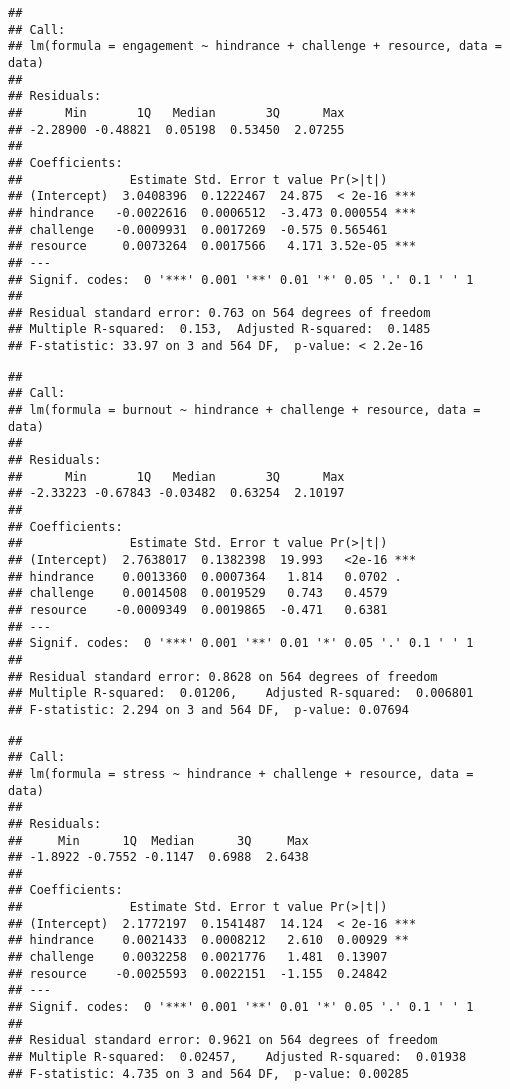 \documentclass[
  man]{apa6}
\begin{document}
\begin{verbatim}
## 
## Call:
## lm(formula = engagement ~ hindrance + challenge + resource, data = data)
## 
## Residuals:
##      Min       1Q   Median       3Q      Max 
## -2.28900 -0.48821  0.05198  0.53450  2.07255 
## 
## Coefficients:
##               Estimate Std. Error t value Pr(>|t|)    
## (Intercept)  3.0408396  0.1222467  24.875  < 2e-16 ***
## hindrance   -0.0022616  0.0006512  -3.473 0.000554 ***
## challenge   -0.0009931  0.0017269  -0.575 0.565461    
## resource     0.0073264  0.0017566   4.171 3.52e-05 ***
## ---
## Signif. codes:  0 '***' 0.001 '**' 0.01 '*' 0.05 '.' 0.1 ' ' 1
## 
## Residual standard error: 0.763 on 564 degrees of freedom
## Multiple R-squared:  0.153,  Adjusted R-squared:  0.1485 
## F-statistic: 33.97 on 3 and 564 DF,  p-value: < 2.2e-16
\end{verbatim}

\begin{verbatim}
## 
## Call:
## lm(formula = burnout ~ hindrance + challenge + resource, data = data)
## 
## Residuals:
##      Min       1Q   Median       3Q      Max 
## -2.33223 -0.67843 -0.03482  0.63254  2.10197 
## 
## Coefficients:
##               Estimate Std. Error t value Pr(>|t|)    
## (Intercept)  2.7638017  0.1382398  19.993   <2e-16 ***
## hindrance    0.0013360  0.0007364   1.814   0.0702 .  
## challenge    0.0014508  0.0019529   0.743   0.4579    
## resource    -0.0009349  0.0019865  -0.471   0.6381    
## ---
## Signif. codes:  0 '***' 0.001 '**' 0.01 '*' 0.05 '.' 0.1 ' ' 1
## 
## Residual standard error: 0.8628 on 564 degrees of freedom
## Multiple R-squared:  0.01206,    Adjusted R-squared:  0.006801 
## F-statistic: 2.294 on 3 and 564 DF,  p-value: 0.07694
\end{verbatim}

\begin{verbatim}
## 
## Call:
## lm(formula = stress ~ hindrance + challenge + resource, data = data)
## 
## Residuals:
##     Min      1Q  Median      3Q     Max 
## -1.8922 -0.7552 -0.1147  0.6988  2.6438 
## 
## Coefficients:
##               Estimate Std. Error t value Pr(>|t|)    
## (Intercept)  2.1772197  0.1541487  14.124  < 2e-16 ***
## hindrance    0.0021433  0.0008212   2.610  0.00929 ** 
## challenge    0.0032258  0.0021776   1.481  0.13907    
## resource    -0.0025593  0.0022151  -1.155  0.24842    
## ---
## Signif. codes:  0 '***' 0.001 '**' 0.01 '*' 0.05 '.' 0.1 ' ' 1
## 
## Residual standard error: 0.9621 on 564 degrees of freedom
## Multiple R-squared:  0.02457,    Adjusted R-squared:  0.01938 
## F-statistic: 4.735 on 3 and 564 DF,  p-value: 0.00285
\end{verbatim}
\end{document}
